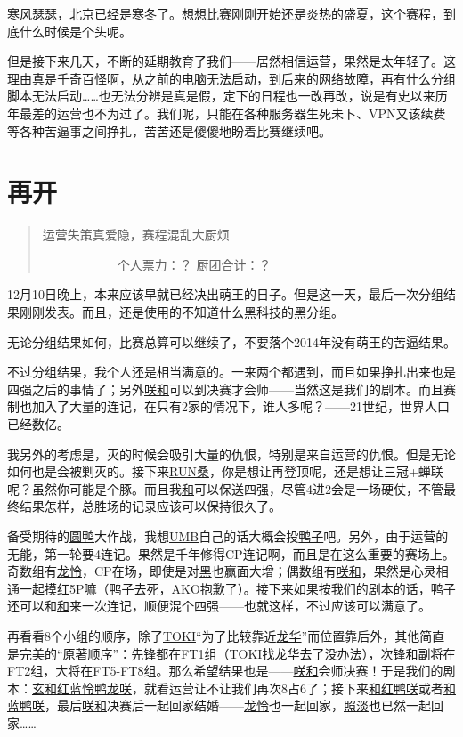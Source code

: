 寒风瑟瑟，北京已经是寒冬了。想想比赛刚刚开始还是炎热的盛夏，这个赛程，到底什么时候是个头呢。

但是接下来几天，不断的延期教育了我们——居然相信运营，果然是太年轻了。这理由真是千奇百怪啊，从之前的电脑无法启动，到后来的网络故障，再有什么分组脚本无法启动……也无法分辨是真是假，定下的日程也一改再改，说是有史以来历年最差的运营也不为过了。我们呢，只能在各种服务器生死未卜、VPN又该续费等各种苦逼事之间挣扎，苦苦还是傻傻地盼着比赛继续吧。

\chapter{再开}
\begin{quote}
运营失策真爱隐，赛程混乱大厨烦

　　　　　　个人票力：？ 厨团合计：？
\end{quote}

12月10日晚上，本来应该早就已经决出萌王的日子。但是这一天，最后一次分组结果刚刚发表。而且，还是使用的不知道什么黑科技的黑分组。

无论分组结果如何，比赛总算可以继续了，不要落个2014年没有萌王的苦逼结果。

不过分组结果，我个人还是相当满意的。一来两个都遇到，而且如果挣扎出来也是四强之后的事情了；另外\uline{咲}\uline{和}可以到决赛才会师——当然这是我们的剧本。而且赛制也加入了大量的连记，在只有2家的情况下，谁人多呢？——21世纪，世界人口已经数亿。

我另外的考虑是，灭的时候会吸引大量的仇恨，特别是来自运营的仇恨。但是无论如何也是会被剿灭的。接下来\uline{RUN桑}，你是想让再登顶呢，还是想让三冠+蝉联呢？虽然你可能是个豚。而且我\uline{和}可以保送四强，尽管4进2会是一场硬仗，不管最终结果怎样，总胜场的记录应该可以保持很久了。

备受期待的\uline{圆}\uline{鸭}大作战，我想\uline{UMB}自己的话大概会投\uline{鸭子}吧。另外，由于运营的无能，第一轮要4连记。果然是千年修得CP连记啊，而且是在这么重要的赛场上。奇数组有\uline{龙}\uline{怜}，CP在场，即使是对\uline{黑}也赢面大增；偶数组有\uline{咲}\uline{和}，果然是心灵相通一起摸红5P嘛（\uline{鸭子}去死，\uline{AKO}抱歉了）。接下来如果按我们的剧本的话，\uline{鸭子}还可以和\uline{和}来一次连记，顺便混个四强——也就这样，不过应该可以满意了。

再看看8个小组的顺序，除了\uline{TOKI}“为了比较靠近\uline{龙华}”而位置靠后外，其他简直是完美的“原著顺序”：先锋都在FT1组（\uline{TOKI}找\uline{龙华}去了没办法），次锋和副将在FT2组，大将在FT5-FT8组。那么希望结果也是——\uline{咲}\uline{和}会师决赛！于是我们的剧本：\uline{玄和红蓝怜鸭龙咲}，就看运营让不让我们再次8占6了；接下来\uline{和红鸭咲}或者\uline{和蓝鸭咲}，最后\uline{咲}\uline{和}决赛后一起回家结婚——\uline{龙}\uline{怜}也一起回家，\uline{照淡}也已然一起回家……

